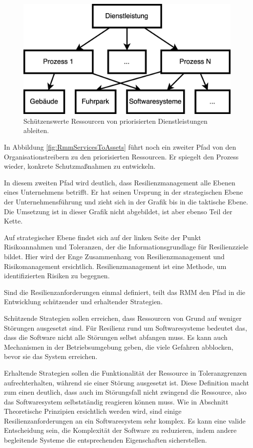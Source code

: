 \documentclass[]{lni}
\begin{document}
\begin{figure}[ht]
    \centering
    \includegraphics[width=.5\textwidth]{images/ServicesToResources.drawio.png}
    \caption{Schützenswerte Ressourcen von priorisierten Dienstleistungen ableiten.}
    \label{fig:ServicesToResources}
\end{figure}



In Abbildung \ref{fig:RmmServicesToAssets} führt noch ein zweiter Pfad von den Organisationstreibern zu den priorisierten Ressourcen. Er spiegelt den Prozess wieder, konkrete Schutzmaßnahmen zu entwickeln.

In diesem zweiten Pfad wird deutlich, dass Resilienzmanagement alle Ebenen eines Unternehmens betrifft. Er hat seinen Ursprung in der strategischen Ebene der Unternehmensführung und zieht sich in der Grafik bis in die taktische Ebene. Die Umsetzung ist in dieser Grafik nicht abgebildet, ist aber ebenso Teil der Kette.

Auf strategischer Ebene findet sich auf der linken Seite der Punkt \glqq Risikoannahmen und Toleranzen\grqq{}, der die Informationsgrundlage für \glqq Resilienzziele\grqq{} bildet. Hier wird der Enge Zusammenhang von Resilienzmanagement und Risikomanagement ersichtlich. Resilienzmanagement ist eine Methode, um identifizierten Risiken zu begegnen. 

Sind die Resilienzanforderungen einmal definiert, teilt das RMM den Pfad in die Entwicklung schützender und erhaltender Strategien. 

Schützende Strategien sollen erreichen, dass Ressourcen von Grund auf weniger Störungen ausgesetzt sind. Für Resilienz rund um Softwaresysteme bedeutet das, dass die Software nicht alle Störungen selbst abfangen muss. Es kann auch Mechanismen in der Betriebsumgebung geben, die viele Gefahren abblocken, bevor sie das System erreichen.

Erhaltende Strategien sollen die Funktionalität der Ressource in Toleranzgrenzen aufrechterhalten, während sie einer Störung ausgesetzt ist. Diese Definition macht zum einen deutlich, dass auch im Störungsfall nicht zwingend die Ressource, also das Softwaresystem selbstständig reagieren können muss. Wie in Abschnitt \glqq Theoretische Prinzipien\grqq{} ersichtlich werden wird, sind einige Resilienzanforderungen an ein Softwaresystem sehr komplex. Es kann eine valide Entscheidung sein, die Komplexität der Software zu reduzieren, indem andere begleitende Systeme die entsprechenden Eigenschaften sicherstellen.
\end{document}
